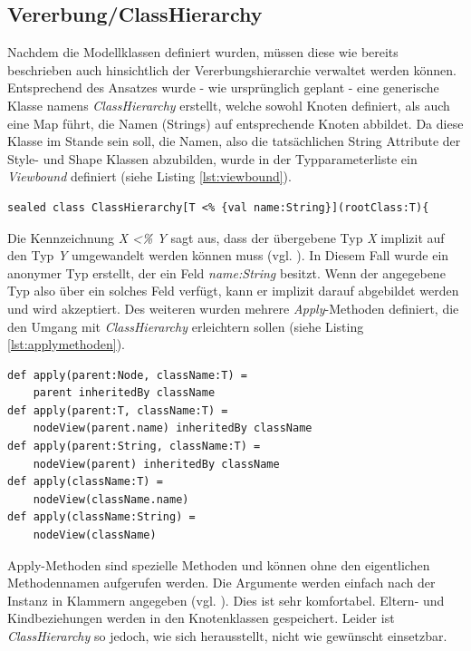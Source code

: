\subsection{Vererbung/ClassHierarchy}
Nachdem die Modellklassen definiert wurden, müssen diese wie bereits beschrieben auch hinsichtlich der Vererbungshierarchie verwaltet werden können. Entsprechend des Ansatzes wurde - wie ursprünglich geplant - eine generische Klasse namens \textit{ClassHierarchy} erstellt, welche sowohl Knoten definiert,
als auch eine Map führt, die Namen (Strings) auf entsprechende Knoten abbildet.
Da diese Klasse im Stande sein soll, die Namen, also die tatsächlichen String  Attribute der Style- und Shape Klassen abzubilden, wurde in der Typparameterliste ein \textit{Viewbound} definiert (siehe Listing \ref{lst:viewbound}).
\begin{lstlisting}[style=scala, caption = {Auszug aus Code Viewbound. Implizite Umwandlung auf { val name:String}}, label = {lst:viewbound}]
sealed class ClassHierarchy[T <% {val name:String}](rootClass:T){
\end{lstlisting}Die Kennzeichnung \textit{ X \textless\% Y} sagt aus, dass der übergebene Typ \textit{X} implizit auf den Typ \textit{Y} umgewandelt werden können muss (vgl. ).
In Diesem Fall wurde ein anonymer Typ erstellt, der ein Feld \textit{name:String} besitzt. Wenn der angegebene Typ also über ein solches Feld verfügt, kann er implizit darauf abgebildet werden und wird akzeptiert.
Des weiteren wurden mehrere \textit{Apply}-Methoden definiert, die den Umgang mit \textit{ClassHierarchy} erleichtern sollen (siehe Listing \ref{lst:applymethoden}).
\begin{lstlisting}[style=scala, caption = {Auszug aus Code Apply Methoden, die die Benutzung von ClassHierarchy erleichtern}, label = {lst:applymethoden}]
def apply(parent:Node, className:T) =
	parent inheritedBy className
def apply(parent:T, className:T) =
	nodeView(parent.name) inheritedBy className
def apply(parent:String, className:T) =
	nodeView(parent) inheritedBy className
def apply(className:T) =
	nodeView(className.name)
def apply(className:String) = 
	nodeView(className)
\end{lstlisting}Apply-Methoden sind spezielle Methoden und können ohne den eigentlichen Methodennamen aufgerufen werden. Die Argumente werden einfach nach der Instanz in Klammern angegeben (vgl. ). Dies ist sehr komfortabel. Eltern- und Kindbeziehungen werden in den Knotenklassen gespeichert. Leider ist \textit{ClassHierarchy} so jedoch, wie sich herausstellt, nicht wie gewünscht einsetzbar.
